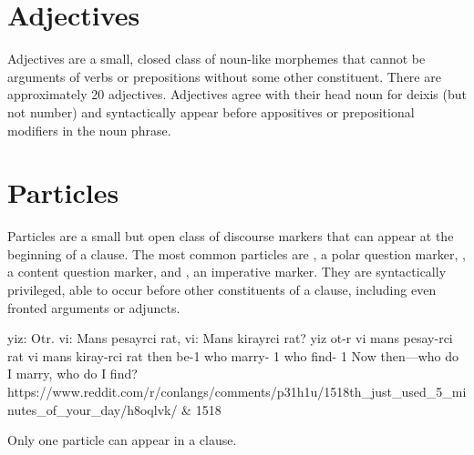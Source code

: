 \setchapterpreamble[u]{\margintoc}
\chapter{Adjectives}
Adjectives are a small, closed class of noun-like morphemes that cannot be arguments of verbs or prepositions without some other constituent. There are approximately 20 adjectives. Adjectives agree with their head noun for deixis (but not number) and syntactically appear before appositives or prepositional modifiers in the noun phrase.

\setchapterpreamble[u]{\margintoc}
\chapter{Particles}
Particles are a small but open class of discourse markers that can appear at the beginning of a clause. The most common particles are , a polar question marker, , a content question marker, and , an imperative marker. They are syntactically privileged, able to occur before other constituents of a clause, including even fronted arguments or adjuncts.

\begin{example*}
    \script yiz: Otr. vi: Mans pesayrci rat, vi: Mans kirayrci rat?
    \bits  yiz ot-r vi mans pesay-rci rat vi mans kiray-rci rat
    \gloss then be-{1}  who marry- {1}  who find- {1}
    \tr Now then---who do I marry, who do I find?
    \smoyd https://www.reddit.com/r/conlangs/comments/p31h1u/1518th_just_used_5_minutes_of_your_day/h8oqlvk/ & 1518
\end{example*}  

Only one particle can appear in a clause.




